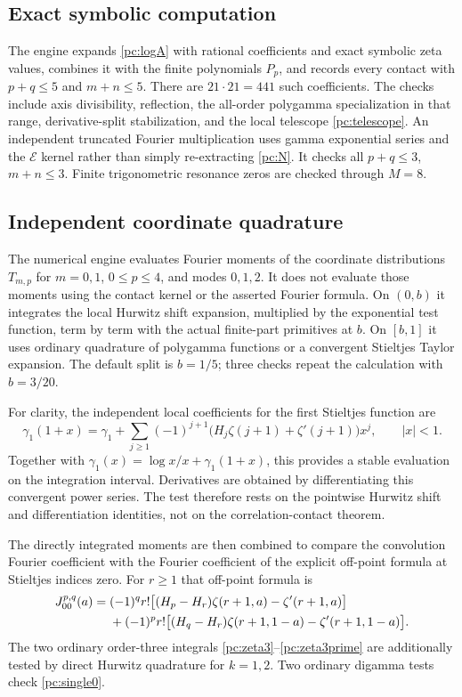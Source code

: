 \documentclass[11pt,a4paper]{article}
\numberwithin{equation}{section}
\theoremstyle{definition}
\newcommand{\Ef}{\mathcal E}
\begin{document}
\subsection{Exact symbolic computation}
The engine expands \eqref{pc:logA} with rational coefficients and exact symbolic zeta values, combines it with the finite polynomials $P_p$, and records every contact with $p+q\le5$ and $m+n\le5$. There are $21\cdot21=441$ such coefficients. The checks include axis divisibility, reflection, the all-order polygamma specialization in that range, derivative-split stabilization, and the local telescope \eqref{pc:telescope}. An independent truncated Fourier multiplication uses gamma exponential series and the $\Ef$ kernel rather than simply re-extracting \eqref{pc:N}. It checks all $p+q\le3$, $m+n\le3$. Finite trigonometric resonance zeros are checked through $M=8$.



\subsection{Independent coordinate quadrature}
The numerical engine evaluates Fourier moments of the coordinate distributions $T_{m,p}$ for $m=0,1$, $0\le p\le4$, and modes $0,1,2$. It does not evaluate those moments using the contact kernel or the asserted Fourier formula. On $(0,b)$ it integrates the local Hurwitz shift expansion, multiplied by the exponential test function, term by term with the actual finite-part primitives at $b$. On $[b,1]$ it uses ordinary quadrature of polygamma functions or a convergent Stieltjes Taylor expansion. The default split is $b=1/5$; three checks repeat the calculation with $b=3/20$.

For clarity, the independent local coefficients for the first Stieltjes function are
\begin{equation}\label{pc:numericalseries}
 \gamma_1(1+x)=\gamma_1+
 \sum_{j\ge1}(-1)^{j+1}
 \bigl(H_j\zeta(j+1)+\zeta'(j+1)\bigr)x^j,
 \qquad |x|<1.
\end{equation}
Together with $\gamma_1(x)=\log x/x+\gamma_1(1+x)$, this provides a stable evaluation on the integration interval. Derivatives are obtained by differentiating this convergent power series. The test therefore rests on the pointwise Hurwitz shift and differentiation identities, not on the correlation-contact theorem.

The directly integrated moments are then combined to compare the convolution Fourier coefficient with the Fourier coefficient of the explicit off-point formula at Stieltjes indices zero. For $r\ge1$ that off-point formula is
\begin{align}\label{pc:J00explicit}
 J_{00}^{p,q}(a)={}&(-1)^qr!\bigl[(H_p-H_r)\zeta(r+1,a)-\zeta'(r+1,a)\bigr]\notag\\
 &+(-1)^pr!\bigl[(H_q-H_r)\zeta(r+1,1-a)-\zeta'(r+1,1-a)\bigr].
\end{align}
The two ordinary order-three integrals \eqref{pc:zeta3}--\eqref{pc:zeta3prime} are additionally tested by direct Hurwitz quadrature for $k=1,2$. Two ordinary digamma tests check \eqref{pc:single0}.
\end{document}
